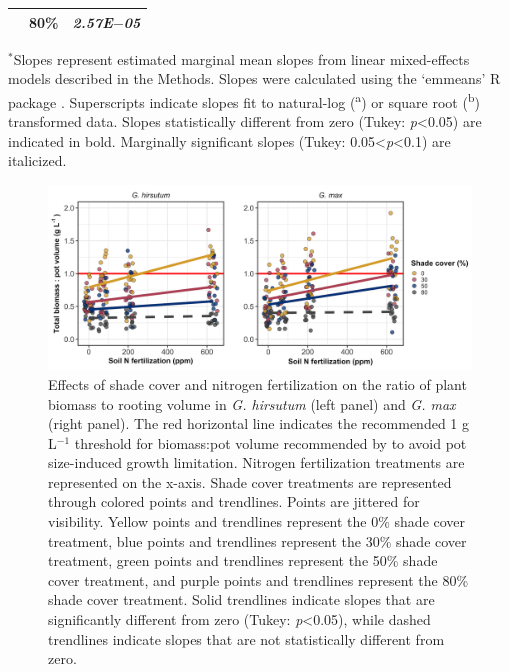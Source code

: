 \begin{landscape}
\begin{table}
\begin{tabular}{p{0.5cm}p{2cm}p{3cm}}
            & \multicolumn{1}{r}{80\%}
            &  \multicolumn{1}{r}{\textit{2.57E$-$05}} 
            \\
            \hline
        \end{tabular}%
        \label{tab:tablec.3}
    \end{table}
    \begin{singlespace}
        \noindent $^*$Slopes represent estimated marginal mean slopes from linear mixed-effects models described in the Methods. Slopes were calculated using the `emmeans’ R package . Superscripts indicate slopes fit to natural-log (\textsuperscript{a}) or square root (\textsuperscript{b}) transformed data. Slopes statistically different from zero (Tukey: \textit{p}<0.05) are indicated in bold. Marginally significant slopes (Tukey: 0.05<\textit{p}<0.1) are italicized.
    \end{singlespace}
\end{landscape}
\clearpage

\newpage
\begin{landscape}
\begin{figure}
    \centering
    \includegraphics[width=\linewidth]{ch2_LxN_Greenhouse/figs/figs1_bvr.png}
    \caption[Effects of shade cover and nitrogen fertilization on the ratio of plant biomass to rooting volume in \textit{G. hirsutum} and \textit{G. max}.]{Effects of shade cover and nitrogen fertilization on the ratio of plant biomass to rooting volume in \textit{G. hirsutum} (left panel) and \textit{G. max} (right panel). The red horizontal line indicates the recommended 1 g L$^{-1}$ threshold for biomass:pot volume recommended by  to avoid pot size-induced growth limitation. Nitrogen fertilization treatments are represented on the x-axis. Shade cover treatments are represented through colored points and trendlines. Points are jittered for visibility. Yellow points and trendlines represent the 0\% shade cover treatment, blue points and trendlines represent the 30\% shade cover treatment, green points and trendlines represent the 50\% shade cover treatment, and purple points and trendlines represent the 80\% shade cover treatment. Solid trendlines indicate slopes that are significantly different from zero (Tukey: \textit{p}<0.05), while dashed trendlines indicate slopes that are not statistically different from zero.}
    \label{fig:figure.a1}
\end{figure}
\end{landscape}
\clearpage